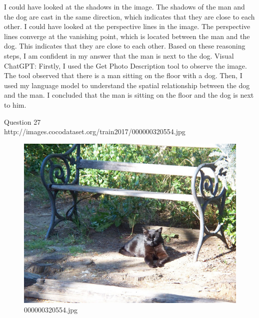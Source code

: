 \begin{enumerate}
        I could have looked at the shadows in the image. The shadows of the man and the dog are cast in the same direction, which indicates that they are close to each other.
        I could have looked at the perspective lines in the image. The perspective lines converge at the vanishing point, which is located between the man and the dog. This indicates that they are close to each other.
        Based on these reasoning steps, I am confident in my answer that the man is next to the dog.
        \subitem Visual ChatGPT: Firstly, I used the Get Photo Description tool to observe the image. The tool observed that there is a man sitting on the floor with a dog. Then, I used my language model to understand the spatial relationship between the dog and the man. I concluded that the man is sitting on the floor and the dog is next to him.
    \end{enumerate}
Question 27\\
http://images.cocodataset.org/train2017/000000320554.jpg
    \begin{figure}[h]
        \centering
        \includegraphics[width=0.8\linewidth]{../image set/easy/000000320554.jpg}
        \caption{000000320554.jpg}
    \end{figure}

